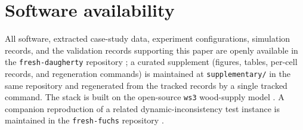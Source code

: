 \section{Software availability}

All software, extracted case-study data, experiment configurations, simulation records, and the validation records supporting this paper are openly available in the \texttt{fresh-daugherty} repository \citep{freshdaugherty}; a curated supplement (figures, tables, per-cell records, and regeneration commands) is maintained at \texttt{supplementary/} in the same repository and regenerated from the tracked records by a single tracked command. The stack is built on the open-source \texttt{ws3} wood-supply model \citep{paradis2026ws3}. A companion reproduction of a related dynamic-inconsistency test instance is maintained in the \texttt{fresh-fuchs} repository \citep{freshfuchs}.
